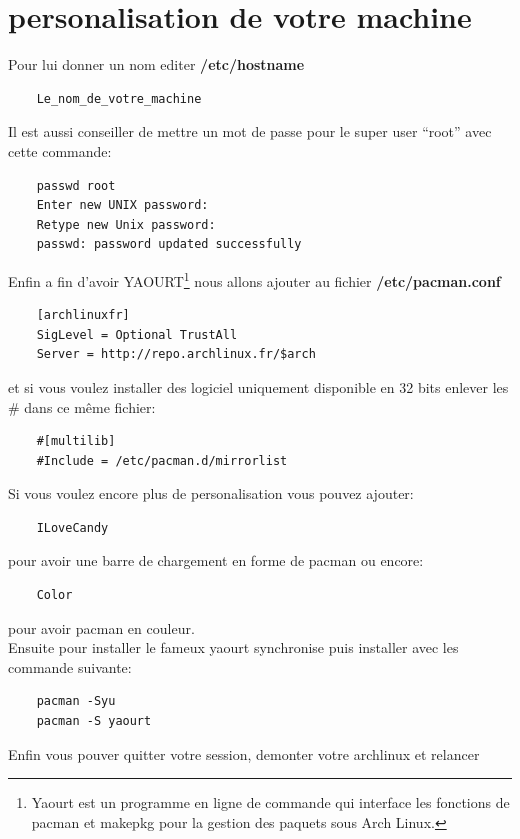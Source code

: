 \documentclass[a4paper]{book}
\begin{document}
  \chapter{personalisation de votre machine}
  Pour lui donner un nom editer \textbf{/etc/hostname}\\
  \begin{lstlisting}
    Le_nom_de_votre_machine
  \end{lstlisting}
  Il est aussi conseiller de mettre un mot de passe pour le super user ``root''
  avec cette commande\@:\\
  \begin{lstlisting}
    passwd root
    Enter new UNIX password:
    Retype new Unix password:
    passwd: password updated successfully
  \end{lstlisting}
  Enfin a fin d'avoir YAOURT\footnote{Yaourt est un programme en ligne de 
    commande qui interface les fonctions de pacman et makepkg pour la gestion 
  des paquets sous Arch Linux.} nous allons ajouter au fichier
  \textbf{/etc/pacman.conf}\\
  \begin{lstlisting}
    [archlinuxfr]
    SigLevel = Optional TrustAll
    Server = http://repo.archlinux.fr/$arch
  \end{lstlisting}
  et si vous voulez installer des logiciel uniquement disponible en 32 bits enlever les \#
  dans ce même fichier\@:\\
  \begin{lstlisting}
    #[multilib]
    #Include = /etc/pacman.d/mirrorlist
  \end{lstlisting}
  Si vous voulez encore plus de personalisation vous pouvez ajouter\@:\\
  \begin{lstlisting}
    ILoveCandy
  \end{lstlisting}
  pour avoir une barre de chargement en forme de pacman ou encore\@:\\
  \begin{lstlisting}
    Color
  \end{lstlisting}
  pour avoir pacman en couleur.\\
  Ensuite pour installer le fameux yaourt synchronise puis installer avec les
  commande suivante\@:\\
  \begin{lstlisting}
    pacman -Syu
    pacman -S yaourt
  \end{lstlisting}
  Enfin vous pouver quitter votre session, demonter votre archlinux et relancer
\end{document}
